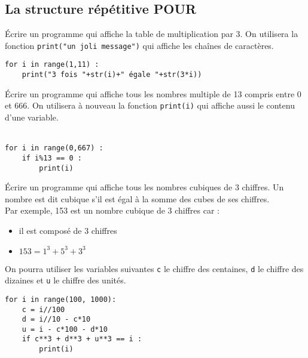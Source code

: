 \subsection{La structure répétitive \textbf{POUR}}
\begin{cor}[Python]
Écrire un programme qui affiche la table de multiplication par 3. On utilisera la fonction \texttt{print("un joli message")} qui affiche les chaînes de caractères.
\begin{lstlisting}
for i in range(1,11) :
	print("3 fois "+str(i)+" égale "+str(3*i))
\end{lstlisting}
\end{cor}


\begin{cor}[Python (*)]
\begin{multicols}{2}
Écrire un programme qui affiche tous les nombres multiple de 13 compris entre 0 et 666. On utilisera à nouveau la fonction \texttt{print(i)} qui affiche aussi le contenu d'une variable.\\ \\
\columnbreak
\begin{lstlisting}
for i in range(0,667) :
	if i%13 == 0 :
		print(i)
\end{lstlisting}
\end{multicols}
\end{cor}

\begin{cor}[Python (**)]
\begin{multicols}{2}
Écrire un programme qui affiche tous les nombres cubiques de 3 chiffres. Un nombre est dit cubique s'il est égal à la somme des cubes de ses chiffres.\\
Par exemple, 153 est un nombre cubique de 3 chiffres car :
\begin{itemize}
	\item il est composé de 3 chiffres
	\item $153 = 1^3 + 5^3 + 3^3$
\end{itemize}
On pourra utiliser les variables suivantes \texttt{c} le chiffre des centaines, \texttt{d} le chiffre des dizaines et \texttt{u} le chiffre des unités.\\
\columnbreak
\begin{lstlisting}
for i in range(100, 1000):
	c = i//100
	d = i//10 - c*10
	u = i - c*100 - d*10
	if c**3 + d**3 + u**3 == i :
		print(i)
\end{lstlisting}
\end{multicols}
\end{cor}

